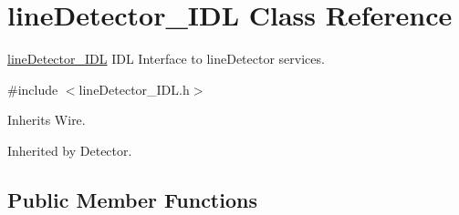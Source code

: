 \section{line\+Detector\+\_\+\+I\+DL Class Reference}
\label{classlineDetector__IDL}


\mbox{\hyperlink{classlineDetector__IDL}{line\+Detector\+\_\+\+I\+DL}} I\+DL Interface to line\+Detector services.  




{\ttfamily \#include $<$line\+Detector\+\_\+\+I\+D\+L.\+h$>$}



Inherits Wire.



Inherited by Detector.

\subsection*{Public Member Functions}
